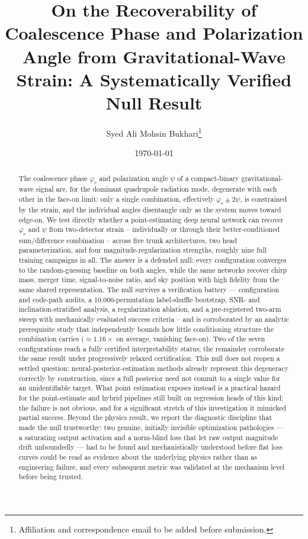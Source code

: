 \documentclass[11pt]{article}
\title{On the Recoverability of Coalescence Phase and Polarization Angle from Gravitational-Wave Strain: A Systematically Verified Null Result}
\author{Syed Ali Mohsin Bukhari\thanks{Affiliation and correspondence email to be added before submission.}}
\date{\today}
\begin{document}
\maketitle

\begin{abstract}
The coalescence phase $\varphi_c$ and polarization angle $\psi$ of a compact-binary gravitational-wave signal are, for the dominant quadrupole radiation mode, degenerate with each other in the face-on limit: only a single combination, effectively $\varphi_c \pm 2\psi$, is constrained by the strain, and the individual angles disentangle only as the system moves toward edge-on.
We test directly whether a point-estimating deep neural network can recover $\varphi_c$ and $\psi$ from two-detector strain – individually or through their better-conditioned sum/difference combination – across five trunk architectures, two head parameterization, and four magnitude-regularization strengths, roughly nine full training campaigns in all.
The answer is a defended null: every configuration converges to the random-guessing baseline on both angles, while the same networks recover chirp mass, merger time, signal-to-noise ratio, and sky position with high fidelity from the same shared representation.
The null survives a verification battery --- configuration and code-path audits, a 10{,}000-permutation label-shuffle bootstrap, SNR- and inclination-stratified analysis, a regularization ablation, and a pre-registered two-arm sweep with mechanically evaluated success criteria – and is corroborated by an analytic prerequisite study that independently bounds how little conditioning structure the combination carries ($\approx 1.16\times$ on average, vanishing face-on).
Two of the seven configurations reach a fully certified interpretability status; the remainder corroborate the same result under progressively relaxed certification.
This null does not reopen a settled question: neural-posterior-estimation methods already represent this degeneracy correctly by construction, since a full posterior need not commit to a single value for an unidentifiable target.
What point estimation exposes instead is a practical hazard for the point-estimate and hybrid pipelines still built on regression heads of this kind: the failure is not obvious, and for a significant stretch of this investigation it mimicked partial success.
Beyond the physics result, we report the diagnostic discipline that made the null trustworthy: two genuine, initially invisible optimization pathologies --- a saturating output activation and a norm-blind loss that let raw output magnitude drift unboundedly --- had to be found and mechanistically understood before flat loss curves could be read as evidence about the underlying physics rather than as engineering failure, and every subsequent metric was validated at the mechanism level before being trusted.
\end{abstract}
\end{document}

